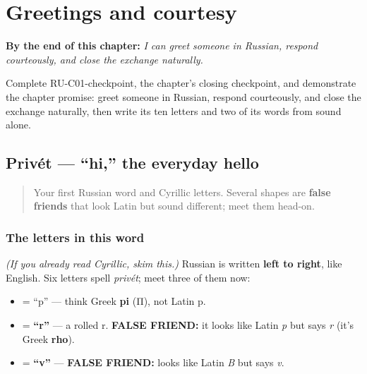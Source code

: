 
\chapter{Greetings and courtesy}
\label{ch:russian-greetings}

\begin{chapteropening}
\textbf{By the end of this chapter:} \emph{I can greet someone in Russian, respond courteously, and close the exchange naturally.}

Complete RU-C01-checkpoint, the chapter's closing checkpoint, and demonstrate the chapter promise: greet someone in Russian, respond courteously, and close the exchange naturally, then write its ten letters and two of its words from sound alone.
\end{chapteropening}

\section[\texorpdfstring{\ru{привет} (privét)}{привет (privét)}]{Privét — \textquotedblleft{}hi,\textquotedblright{} the everyday hello}

\label{lesson:RU-C01-privet}



\begin{quote}
Your first Russian word and Cyrillic letters. Several shapes are \textbf{false friends} that look Latin but sound different; meet them head-on.
\end{quote}

\subsection*{The letters in this word}
\emph{(If you already read Cyrillic, skim this.)} Russian is written \textbf{left to right}, like English. Six letters spell \emph{privét}; meet three of them now:

\begin{itemize}
\raggedright
  \item \textbf{} = \textquotedblleft{}p\textquotedblright{} — think Greek \textbf{pi} (Π), not Latin p.
  \item \textbf{} = \textbf{\textquotedblleft{}r\textquotedblright{}} — a rolled r. \textbf{FALSE FRIEND:} it looks like Latin \emph{p} but says \emph{r} (it's Greek \textbf{rho}).
  \item \textbf{} = \textbf{\textquotedblleft{}v\textquotedblright{}} — \textbf{FALSE FRIEND:} looks like Latin \emph{B} but says \emph{v}.
\end{itemize}

